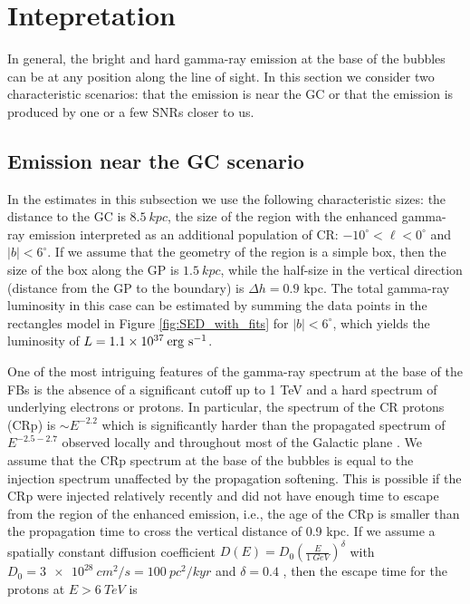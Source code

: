 \section{Intepretation}
\label{sec:Interpretation}

In general, the bright and hard gamma-ray emission at the base of the bubbles can be at any position along the line of sight.
In this section we consider two characteristic scenarios: that the emission is near the GC or that the emission is 
produced by one or a few SNRs closer to us. 

\subsection{Emission near the GC scenario}

In the estimates in this subsection we use the following characteristic sizes: 
the distance to the GC is $\SI{8.5}{kpc}$, 
the size of the region with the enhanced gamma-ray emission interpreted as an additional population of CR:
$-10^\circ < \ell < 0^\circ$ and $|b| < 6^\circ$.
If we assume that the geometry of the region is a simple box, then the size of the box along the GP is $\SI{1.5}{kpc}$,
while the half-size in the vertical direction (distance from the GP to the boundary) is $\Delta h = 0.9$ kpc.
The total gamma-ray luminosity in this case can be estimated 
by summing the data points in the rectangles model in Figure \ref{fig:SED_with_fits}
for $|b| < 6^\circ$, which yields the luminosity of $L = 1.1 \times 10^{37}\:{\rm erg\ s^{-1}}$.

One of the most intriguing features of the gamma-ray spectrum at the base of the FBs is the absence of a significant cutoff up to 1 TeV and 
a hard spectrum of underlying electrons or protons.
In particular, the spectrum of the CR protons (CRp) is $\sim E^{-2.2}$ which is significantly harder than the propagated spectrum of 
$E^{-2.5 - 2.7}$ observed locally and throughout most of the Galactic plane \citep{2016ApJS..223...26A}.
We assume that the CRp spectrum at the base of the bubbles is equal to the injection spectrum unaffected by the 
propagation softening.
This is possible if the CRp were injected relatively recently and did not have enough time to escape from the region of the enhanced emission,
i.e., the age of the CRp is smaller than the propagation time to cross the vertical distance of 0.9 kpc.
If we assume a spatially constant diffusion coefficient $D(E) = D_0\left(\frac{E}{\SI{1}{GeV}}\right)^\delta$ with 
$D_0 = \SI{3e28}{cm^2/s} = \SI{100}{pc^2/kyr}$ and $\delta = 0.4$ \citep{2007ARNPS..57..285S},
then the escape time for the protons at $E > \SI{6}{TeV}$ is 

